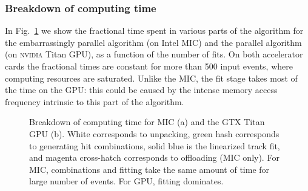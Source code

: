 \documentclass[journal]{IEEEtran}
\begin{document}
\subsubsection{Breakdown of computing time}
In Fig.~\ref{fig:breakdown} we show the fractional time spent in
various parts of the algorithm for the embarrassingly parallel algorithm 
(on Intel MIC) and the parallel algorithm (on \textsc{nvidia} Titan GPU), as a 
function of the number of fits. On both accelerator cards the fractional times
are constant for more than 500 input events, where computing resources are saturated. 
Unlike the MIC, the fit stage takes most of the time on the GPU: this 
could be caused by the intense memory access frequency intrinsic to
this part of the algorithm.  
\begin{figure}[!t]
\centering
{}
\caption{Breakdown of computing time for MIC (a) and the GTX Titan GPU
  (b). White corresponds to unpacking, green hash corresponds to
  generating hit combinations, solid blue is the linearized track fit,
  and magenta cross-hatch corresponds to offloading (MIC only). For
  MIC, combinations and fitting take the same amount of time for large
  number of events. For GPU, fitting dominates. }
\label{fig:breakdown}
\end{figure}
\end{document}
